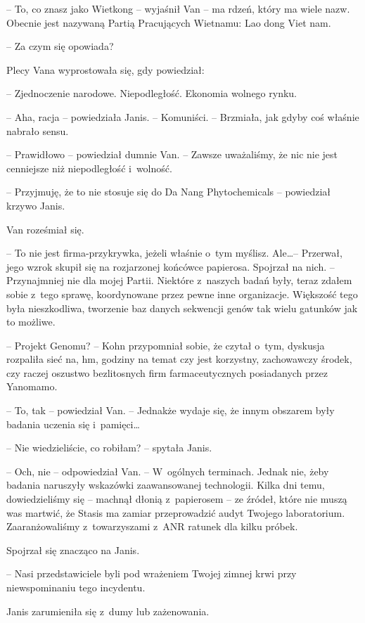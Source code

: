 \documentclass[oneside,polish,11pt,sfheadings]{mwbk}
\begin{document}
-- To, co znasz jako Wietkong -- wyjaśnił Van -- ma rdzeń, który ma wiele
nazw. Obecnie jest nazywaną Partią Pracujących Wietnamu: Lao dong Viet
nam.

-- Za czym się opowiada?

Plecy Vana wyprostowała się, gdy powiedział: 

-- Zjednoczenie narodowe.
Niepodległość. Ekonomia wolnego rynku.

-- Aha, racja -- powiedziała Janis. -- Komuniści. -- Brzmiała, jak gdyby coś
właśnie nabrało sensu.

-- Prawidłowo -- powiedział dumnie Van. -- Zawsze uważaliśmy, że nic nie
jest cenniejsze niż niepodległość i~wolność.

-- Przyjmuję, że to nie stosuje się do Da Nang Phytochemicals -- powiedział krzywo Janis.

Van roześmiał się. 

-- To nie jest firma-przykrywka, jeżeli właśnie o~tym
myślisz. Ale\ldots -- Przerwał, jego wzrok skupił się na rozjarzonej
końcówce papierosa. Spojrzał na nich. -- Przynajmniej nie dla mojej
Partii. Niektóre z~naszych badań były, teraz zdałem sobie z~tego sprawę,
koordynowane przez pewne inne organizacje. Większość tego była
nieszkodliwa, tworzenie baz danych sekwencji genów tak wielu gatunków
jak to możliwe.

-- Projekt Genomu? -- Kohn przypomniał sobie, że czytał o~tym, dyskusja
rozpaliła sieć na, hm, godziny na temat czy jest korzystny, zachowawczy
środek, czy raczej oszustwo bezlitosnych firm farmaceutycznych
posiadanych przez Yanomamo.

-- To, tak -- powiedział Van. -- Jednakże wydaje się, że innym obszarem
były badania uczenia się i~pamięci\ldots

-- Nie wiedzieliście, co robiłam? -- spytała Janis.

-- Och, nie -- odpowiedział Van. -- W~ogólnych terminach. Jednak nie, żeby
badania naruszyły wskazówki zaawansowanej technologii. Kilka dni temu,
dowiedzieliśmy się -- machnął dłonią z~papierosem -- ze źródeł, które nie
muszą was martwić, że Stasis ma zamiar przeprowadzić audyt Twojego
laboratorium. Zaaranżowaliśmy z~towarzyszami z~ANR ratunek dla kilku
próbek.

Spojrzał się znacząco na Janis. 

-- Nasi przedstawiciele byli pod
wrażeniem Twojej zimnej krwi przy niewspominaniu tego incydentu.

Janis zarumieniła się z~dumy lub zażenowania.
\end{document}
